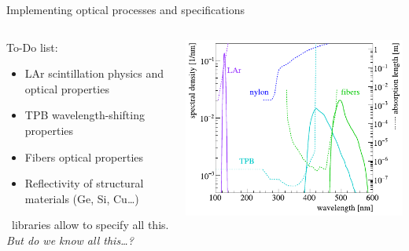 \documentclass[10pt,aspectratio=169]{beamer}
\begin{document}
\begin{frame}{Implementing optical processes and specifications}
  \begin{columns}
    \begin{column}{0.45\textwidth}\setlength{\parskip}{10pt}%
      To-Do list:
      \begin{itemize}
        \item LAr scintillation physics and optical properties
        \item TPB wavelength-shifting properties
        \item Fibers optical properties
        \item Reflectivity of structural materials (Ge, Si, Cu\ldots)
      \end{itemize}
      \geant\ libraries allow to specify all this. \emph{But do we know all
      this\ldots?}
    \end{column}
    \begin{column}{0.55\textwidth}
      \vspace*{0.5cm}
      \includegraphics[width=\columnwidth]{mage-specs.pdf}
    \end{column}
  \end{columns}
\end{frame}
\end{document}
